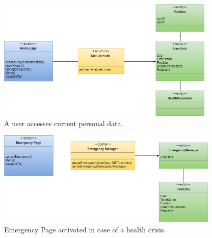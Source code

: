 \begin{figure}[ht]
    \centering
    \includegraphics[width=295pt]{images/BCE/BCE_Diagrams8.jpg}
    \caption{A user accesses current personal data.}
    \label{BCE8}
\end{figure}
\begin{figure}[ht]
    \centering
    \includegraphics[width=300pt]{images/BCE/BCE_Diagrams9.jpg}
    \caption{Emergency Page activated in case of a health crisis.}
    \label{BCE9}
\end{figure}